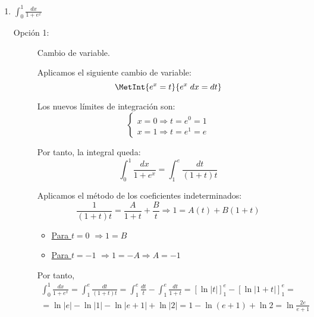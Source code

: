 \begin{ejercicio}
\begin{enumerate}
        \item $\displaystyle \int_0^1 \frac{dx}{1+e^x}$
        
        \begin{description}
            \item[Opción 1:] Cambio de variable.
            
            Aplicamos el siguiente cambio de variable:
            \begin{equation*}
                \MetInt{e^x=t}{e^x\;dx=dt}
            \end{equation*}

            Los nuevos límites de integración son:
            \begin{equation*}
                \left\{\begin{array}{l}
                    x=0 \Longrightarrow t=e^0 =1 \\
                    x=1 \Longrightarrow t=e^1 =e
                \end{array}\right.
            \end{equation*}

            Por tanto, la integral queda:
            \begin{equation*}
                \int_0^1 \frac{dx}{1+e^x}
                = \int_1^{e} \frac{dt}{(1+t)t}
            \end{equation*}

            Aplicamos el método de los coeficientes indeterminados:
            \begin{equation*}
                \frac{1}{(1+t)t} = \frac{A}{1+t}+\frac{B}{t} \Longrightarrow 1=A(t)+B(1+t)
            \end{equation*}

            \begin{itemize}
                \item \underline{Para $t=0$} $\Longrightarrow 1=B$
                \item \underline{Para $t=-1$} $\Longrightarrow 1=-A \Longrightarrow A=-1$
            \end{itemize}

            Por tanto,
            \begin{multline*}
                \int_0^1 \frac{dx}{1+e^x}
                = \int_1^{e} \frac{dt}{(1+t)t}
                = \int_1^{e} \frac{dt}{t}-\int_1^{e} \frac{dt}{1+t}
                = \left[\ln |t|\right]_1^{e}-\left[\ln |1+t|\right]_1^{e}
                =\\= \ln |e|-\ln |1|-\ln |e+1|+\ln |2|
                = 1-\ln (e+1)+\ln 2 = \ln \frac{2e}{e+1}
            \end{multline*}


\end{description}
\end{enumerate}
\end{ejercicio}
